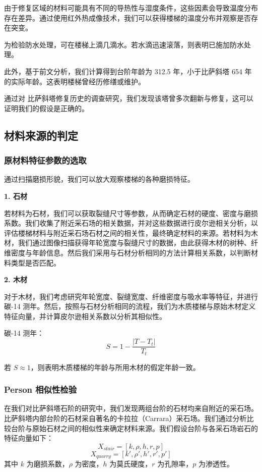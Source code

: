 \documentclass[11pt,a4paper]{ctexart}
\begin{document}
由于修复区域的材料可能具有不同的导热性与湿度条件，这些因素会导致温度分布存在差异。通过使用红外热成像技术，我们可以获得楼梯的温度分布并观察是否存在突变。

为检验防水处理，可在楼梯上滴几滴水。若水滴迅速滚落，则表明已施加防水处理。

此外，基于前文分析，我们计算得到台阶年龄为 312.5 年，小于比萨斜塔 654 年的实际年龄。这表明楼梯曾经历修缮或维护。

通过对 比萨斜塔修复历史的调查研究，我们发现该塔曾多次翻新与修复，这可以证明我们的假设是正确的。

\subsection{材料来源的判定}

\subsubsection{原材料特征参数的选取}

通过扫描磨损形貌，我们可以放大观察楼梯的各种磨损特征。

\noindent\textbf{1. 石材}

若材料为石材，我们可以获取裂缝尺寸等参数，从而确定石材的硬度、密度与磨损系数。我们收集了附近采石场的相关数据，并对这些数据进行皮尔逊相关分析，以评估楼梯材料与附近采石场石材之间的相关性，最终确定材料的来源。若材料为木材，我们通过图像扫描获得年轮宽度与裂缝尺寸的数据，由此获得木材的树种、纤维密度与年龄信息。然后我们采用与石材分析相同的方法计算相关系数，以判断材料类型是否匹配。

\noindent\textbf{2. 木材}

对于木材，我们考虑研究年轮宽度、裂缝宽度、纤维密度与吸水率等特征，并进行碳-14 测年。然后，按照与石材分析相同的流程，我们为木质楼梯与原始木材定义特征向量，并计算皮尔逊相关系数以分析其相似性。

碳-14 测年：
\begin{equation}
S=1-\frac{\left|T-T_t\right|}{T_t}\tag{18}
\end{equation}

若 $S\approx 1$，则表明木质楼梯的年龄与所用木材的假定年龄一致。

\subsubsection{Person 相似性检验}

在我们对比萨斜塔石阶的研究中，我们发现两组台阶的石材均来自附近的采石场。比萨斜塔内部台阶的石材采自著名的卡拉拉（Carrara）采石场\cite{ref9}。我们通过分析比较台阶与原始石材之间的相似性来确定材料来源。我们假设台阶与各采石场岩石的特征向量如下：
\[
X_{stair}=[k,\rho,h,r,p]
\]
\[
X_{quarry}=[k',\rho',h',r',p']
\]
其中 $k$ 为磨损系数，$\rho$ 为密度，$h$ 为莫氏硬度，$r$ 为孔隙率，$p$ 为渗透性。
\end{document}
